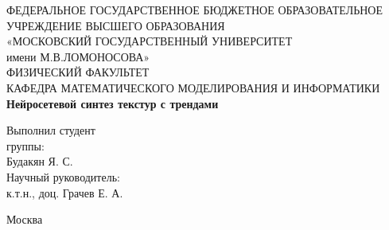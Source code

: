 \documentclass[a4paper]{article}
\begin{document}
	\begin{titlepage} %
		
		\begin{center}
			\footnotesize{ФЕДЕРАЛЬНОЕ ГОСУДАРСТВЕННОЕ БЮДЖЕТНОЕ ОБРАЗОВАТЕЛЬНОЕ }\\ 
			\footnotesize{УЧРЕЖДЕНИЕ ВЫСШЕГО ОБРАЗОВАНИЯ}\\
			\small{«МОСКОВСКИЙ ГОСУДАРСТВЕННЫЙ УНИВЕРСИТЕТ}\\
			\small{имени М.В.ЛОМОНОСОВА»}\\
			\hfill \break
			\normalsize{ФИЗИЧЕСКИЙ ФАКУЛЬТЕТ}\\
			\hfill \break
			\normalsize{КАФЕДРА МАТЕМАТИЧЕСКОГО МОДЕЛИРОВАНИЯ И ИНФОРМАТИКИ}\\
			\hfill \break
			\hfill \break
			\hfill \break
			\hfill \break
			\hfill \break
			\hfill \break
			\large{\textbf{Нейросетевой синтез текстур с трендами}}\\
		\end{center}
		
		\hfill \break
		
		\begin{flushright}
			Выполнил студент \\
			\hfill {} группы:\\
			\hfill \break
			Будакян Я. С.\\
			\hfill \break
			\hfill \break
			\hfill \break
			Научный руководитель: \\
			\hfill \break
			к.т.н., доц. Грачев Е. А.\\
			\hfill \break
		\end{flushright}
		
		\hfill \break
		\hfill \break
		\hfill \break
		\hfill \break
		\hfill \break
		\hfill \break
		
		\begin{center}
			Москва \\
			\hfill {} 
		\end{center}
		
		\thispagestyle{empty} %
		
		
	\end{titlepage}  %
	\setcounter{page}{2}
\end{document}
